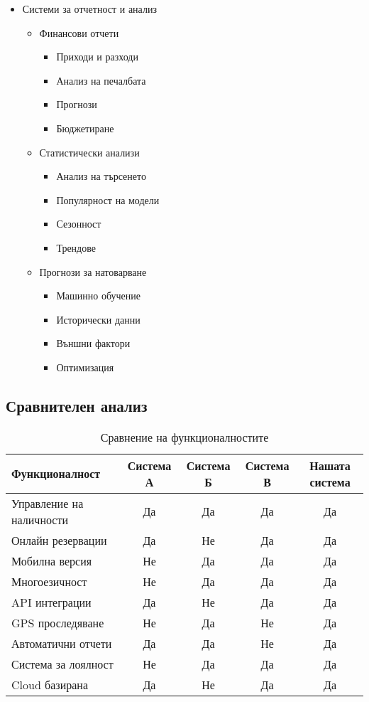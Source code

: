\documentclass[12pt,a4paper]{article}
\begin{document}
\begin{itemize}
    \item Системи за отчетност и анализ
    \begin{itemize}
        \item Финансови отчети
        \begin{itemize}
            \item Приходи и разходи
            \item Анализ на печалбата
            \item Прогнози
            \item Бюджетиране
        \end{itemize}
        \item Статистически анализи
        \begin{itemize}
            \item Анализ на търсенето
            \item Популярност на модели
            \item Сезонност
            \item Трендове
        \end{itemize}
        \item Прогнози за натоварване
        \begin{itemize}
            \item Машинно обучение
            \item Исторически данни
            \item Външни фактори
            \item Оптимизация
        \end{itemize}
    \end{itemize}
\end{itemize}

\subsection{Сравнителен анализ}
\begin{table}[h]
\centering
\begin{tabular}{|l|c|c|c|c|}
\hline
Функционалност & Система А & Система Б & Система В & Нашата система \\
\hline
Управление на наличности & Да & Да & Да & Да \\
Онлайн резервации & Да & Не & Да & Да \\
Мобилна версия & Не & Да & Да & Да \\
Многоезичност & Не & Да & Да & Да \\
API интеграции & Да & Не & Да & Да \\
GPS проследяване & Не & Да & Не & Да \\
Автоматични отчети & Да & Да & Не & Да \\
Система за лоялност & Не & Да & Да & Да \\
Cloud базирана & Да & Не & Да & Да \\
\hline
\end{tabular}
\caption{Сравнение на функционалностите}
\end{table}
\end{document}
